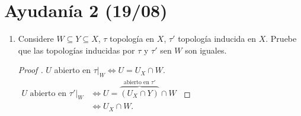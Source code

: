 \documentclass[a4paper]{report}
\begin{document}

\section{Ayudanía 2 (19/08)}

\begin{enumerate}
	\item Considere $W \subseteq Y \subseteq X$, $\tau$ topología en $X$, $\tau'$ topología inducida en $X$. Pruebe que las topologías inducidas por $\tau$ y $\tau'$ sen $W$ son iguales.
	\begin{proof}[Proof ]
		$U$ abierto en $\tau|_{W} \iff U = U_X \cap W$.\\
		$\begin{aligned}
			U \text{ abierto en } \tau'|_{W} & \iff U = \overbrace{(U_X \cap Y)}^{\text{abierto en } \tau'} \cap W \\
			& \iff U_X \cap W
		.\end{aligned}$
	\end{proof}


\end{enumerate}
\end{document}
